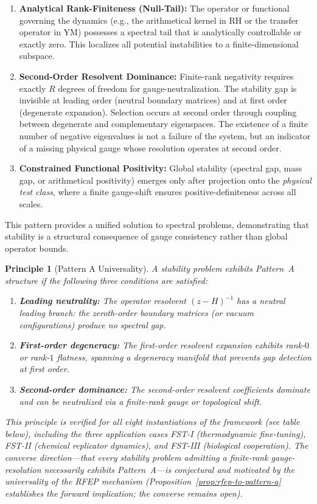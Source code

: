 \documentclass[12pt,a4paper]{article}
\newtheorem{principle}[theorem]{Principle}
\theoremstyle{definition}
\theoremstyle{remark}
\begin{document}
\begin{enumerate}[label=\alph*)]
    \item \textbf{Analytical Rank-Finiteness (Null-Tail):} The operator or functional governing the dynamics (e.g., the arithmetical kernel in RH or the transfer operator in YM) possesses a spectral tail that is analytically controllable or exactly zero. This localizes all potential instabilities to a finite-dimensional subspace.
    \item \textbf{Second-Order Resolvent Dominance:} Finite-rank negativity requires exactly $R$ degrees of freedom for gauge-neutralization. The stability gap is invisible at leading order (neutral boundary matrices) and at first order (degenerate expansion). Selection occurs at second order through coupling between degenerate and complementary eigenspaces. The existence of a finite number of negative eigenvalues is not a failure of the system, but an indicator of a missing physical gauge whose resolution operates at second order.
    \item \textbf{Constrained Functional Positivity:} Global stability (spectral gap, mass gap, or arithmetical positivity) emerges only after projection onto the \emph{physical test class}, where a finite gauge-shift ensures positive-definiteness across all scales.
\end{enumerate}

This pattern provides a unified solution to spectral problems, demonstrating that stability is a structural consequence of gauge consistency rather than global operator bounds.

\begin{principle}[Pattern A Universality]
\label{thm:pattern-a-universality}
A stability problem exhibits Pattern~A structure if the following three conditions are satisfied:
\begin{enumerate}[label=(\roman*)]
    \item \textbf{Leading neutrality:} The operator resolvent $(z - H)^{-1}$ has a neutral leading branch: the zeroth-order boundary matrices (or vacuum configurations) produce no spectral gap.
    \item \textbf{First-order degeneracy:} The first-order resolvent expansion exhibits rank-$0$ or rank-$1$ flatness, spanning a degeneracy manifold that prevents gap detection at first order.
    \item \textbf{Second-order dominance:} The second-order resolvent coefficients dominate and can be neutralized via a finite-rank gauge or topological shift.
\end{enumerate}
This principle is verified for all eight instantiations of the framework (see table below), including the three application cases FST-I (thermodynamic fine-tuning), FST-II (chemical replicator dynamics), and FST-III (biological cooperation). The converse direction---that every stability problem admitting a finite-rank gauge-resolution necessarily exhibits Pattern~A---is conjectural and motivated by the universality of the RFEP mechanism (Proposition~\ref{prop:rfep-to-pattern-a} establishes the forward implication; the converse remains open).
\end{principle}
\end{document}
